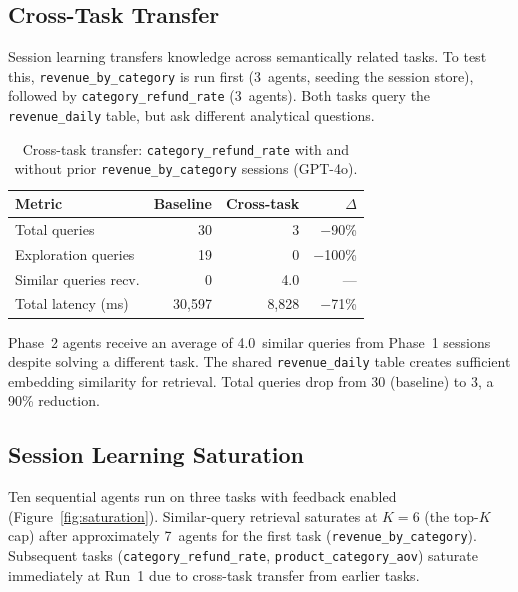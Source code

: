 \documentclass[sigconf, nonacm]{acmart}
\begin{document}
\subsection{Cross-Task Transfer}
\label{sec:cross-task}

Session learning transfers knowledge across semantically related tasks.
To test this, \texttt{revenue\_by\_category} is run first (3~agents,
seeding the session store), followed by \texttt{category\_refund\_rate}
(3~agents).  Both tasks query the \texttt{revenue\_daily} table, but
ask different analytical questions.

\begin{table}[t]
  \centering
  \caption{%
    Cross-task transfer: \texttt{category\_refund\_rate} with and without
    prior \texttt{revenue\_by\_category} sessions (GPT-4o).
  }
  \label{tab:cross-task}
  \begin{tabular}{@{}lrrr@{}}
    \toprule
    \textbf{Metric}
      & \textbf{Baseline}
      & \textbf{Cross-task}
      & \textbf{$\Delta$} \\
    \midrule
    Total queries          & 30    & 3     & $-$90\% \\
    Exploration queries    & 19    & 0     & $-$100\% \\
    Similar queries recv.  & 0     & 4.0   & --- \\
    Total latency (ms)     & 30,597 & 8,828 & $-$71\% \\
    \bottomrule
  \end{tabular}
\end{table}

Phase~2 agents receive an average of 4.0~similar queries from Phase~1
sessions despite solving a different task.  The shared
\texttt{revenue\_daily} table creates sufficient embedding similarity for
retrieval.  Total queries drop from 30 (baseline) to 3, a 90\% reduction.

\subsection{Session Learning Saturation}
\label{sec:saturation}

Ten sequential agents run on three tasks with feedback enabled
(Figure~\ref{fig:saturation}).  Similar-query retrieval saturates at $K{=}6$
(the top-$K$ cap) after approximately 7~agents for the first task
(\texttt{revenue\_by\_category}).  Subsequent tasks
(\texttt{category\_refund\_rate}, \texttt{product\_category\_aov}) saturate
immediately at Run~1 due to cross-task transfer from earlier tasks.
\end{document}
